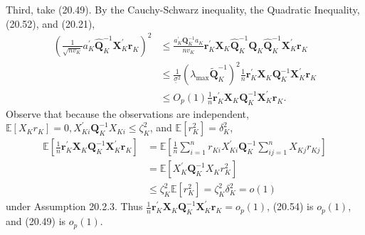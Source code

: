 \documentclass[10pt]{article}
\begin{document}
Third, take (20.49). By the Cauchy-Schwarz inequality, the Quadratic Inequality, (20.52), and (20.21),
$$
\begin{aligned}
\left(\frac{1}{\sqrt{n v_{K}}} a_{K}^{\prime} \widehat{\boldsymbol{Q}}_{K}^{-1} \boldsymbol{X}_{K}^{\prime} \boldsymbol{r}_{K}\right)^{2} & \leq \frac{a_{K}^{\prime} \boldsymbol{Q}_{K}^{-1} a_{K}}{n v_{K}} \boldsymbol{r}_{K}^{\prime} \boldsymbol{X}_{K} \widehat{\boldsymbol{Q}}_{K}^{-1} \boldsymbol{Q}_{K} \widehat{\boldsymbol{Q}}_{K}^{-1} \boldsymbol{X}_{K}^{\prime} \boldsymbol{r}_{K} \\
& \leq \frac{1}{\underline{\sigma}^{2}}\left(\lambda_{\max } \widetilde{\boldsymbol{Q}}_{K}^{-1}\right)^{2} \frac{1}{n} \boldsymbol{r}_{K}^{\prime} \boldsymbol{X}_{K} \boldsymbol{Q}_{K}^{-1} \boldsymbol{X}_{K}^{\prime} \boldsymbol{r}_{K} \\
& \leq O_{p}(1) \frac{1}{n} \boldsymbol{r}_{K}^{\prime} \boldsymbol{X}_{K} \boldsymbol{Q}_{K}^{-1} \boldsymbol{X}_{K}^{\prime} \boldsymbol{r}_{K} .
\end{aligned}
$$
Observe that because the observations are independent, $\mathbb{E}\left[X_{K} r_{K}\right]=0, X_{K i}^{\prime} \boldsymbol{Q}_{K}^{-1} X_{K i} \leq \zeta_{K}^{2}$, and $\mathbb{E}\left[r_{K}^{2}\right]=\delta_{K}^{2}$,
$$
\begin{aligned}
\mathbb{E}\left[\frac{1}{n} \boldsymbol{r}_{K}^{\prime} \boldsymbol{X}_{K} \boldsymbol{Q}_{K}^{-1} \boldsymbol{X}_{K}^{\prime} \boldsymbol{r}_{K}\right] &=\mathbb{E}\left[\frac{1}{n} \sum_{i=1}^{n} r_{K i} X_{K i}^{\prime} \boldsymbol{Q}_{K}^{-1} \sum_{i j=1}^{n} X_{K j} r_{K j}\right] \\
&=\mathbb{E}\left[X_{K}^{\prime} \boldsymbol{Q}_{K}^{-1} X_{K} r_{K}^{2}\right] \\
& \leq \zeta_{K}^{2} \mathbb{E}\left[r_{K}^{2}\right]=\zeta_{K}^{2} \delta_{K}^{2}=o(1)
\end{aligned}
$$
under Assumption 20.2.3. Thus $\frac{1}{n} \boldsymbol{r}_{K}^{\prime} \boldsymbol{X}_{K} \boldsymbol{Q}_{K}^{-1} \boldsymbol{X}_{K}^{\prime} \boldsymbol{r}_{K}=o_{p}(1)$, (20.54) is $o_{p}(1)$, and (20.49) is $o_{p}(1)$.
\end{document}
